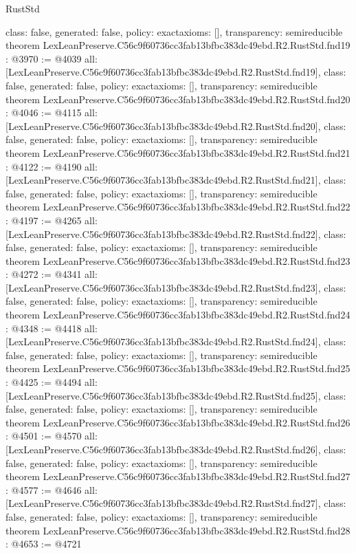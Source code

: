 \begin{lexlean}{RustStd}
\begin{coremodule}
{  class: false,
  generated: false,
  policy: exact{axioms: []},
  transparency: semireducible
}
theorem LexLeanPreserve.C56c9f60736cc3fab13bfbc383dc49ebd.R2.RustStd.fnd19 : @3970 := @4039 {
  all: [LexLeanPreserve.C56c9f60736cc3fab13bfbc383dc49ebd.R2.RustStd.fnd19],
  class: false,
  generated: false,
  policy: exact{axioms: []},
  transparency: semireducible
}
theorem LexLeanPreserve.C56c9f60736cc3fab13bfbc383dc49ebd.R2.RustStd.fnd20 : @4046 := @4115 {
  all: [LexLeanPreserve.C56c9f60736cc3fab13bfbc383dc49ebd.R2.RustStd.fnd20],
  class: false,
  generated: false,
  policy: exact{axioms: []},
  transparency: semireducible
}
theorem LexLeanPreserve.C56c9f60736cc3fab13bfbc383dc49ebd.R2.RustStd.fnd21 : @4122 := @4190 {
  all: [LexLeanPreserve.C56c9f60736cc3fab13bfbc383dc49ebd.R2.RustStd.fnd21],
  class: false,
  generated: false,
  policy: exact{axioms: []},
  transparency: semireducible
}
theorem LexLeanPreserve.C56c9f60736cc3fab13bfbc383dc49ebd.R2.RustStd.fnd22 : @4197 := @4265 {
  all: [LexLeanPreserve.C56c9f60736cc3fab13bfbc383dc49ebd.R2.RustStd.fnd22],
  class: false,
  generated: false,
  policy: exact{axioms: []},
  transparency: semireducible
}
theorem LexLeanPreserve.C56c9f60736cc3fab13bfbc383dc49ebd.R2.RustStd.fnd23 : @4272 := @4341 {
  all: [LexLeanPreserve.C56c9f60736cc3fab13bfbc383dc49ebd.R2.RustStd.fnd23],
  class: false,
  generated: false,
  policy: exact{axioms: []},
  transparency: semireducible
}
theorem LexLeanPreserve.C56c9f60736cc3fab13bfbc383dc49ebd.R2.RustStd.fnd24 : @4348 := @4418 {
  all: [LexLeanPreserve.C56c9f60736cc3fab13bfbc383dc49ebd.R2.RustStd.fnd24],
  class: false,
  generated: false,
  policy: exact{axioms: []},
  transparency: semireducible
}
theorem LexLeanPreserve.C56c9f60736cc3fab13bfbc383dc49ebd.R2.RustStd.fnd25 : @4425 := @4494 {
  all: [LexLeanPreserve.C56c9f60736cc3fab13bfbc383dc49ebd.R2.RustStd.fnd25],
  class: false,
  generated: false,
  policy: exact{axioms: []},
  transparency: semireducible
}
theorem LexLeanPreserve.C56c9f60736cc3fab13bfbc383dc49ebd.R2.RustStd.fnd26 : @4501 := @4570 {
  all: [LexLeanPreserve.C56c9f60736cc3fab13bfbc383dc49ebd.R2.RustStd.fnd26],
  class: false,
  generated: false,
  policy: exact{axioms: []},
  transparency: semireducible
}
theorem LexLeanPreserve.C56c9f60736cc3fab13bfbc383dc49ebd.R2.RustStd.fnd27 : @4577 := @4646 {
  all: [LexLeanPreserve.C56c9f60736cc3fab13bfbc383dc49ebd.R2.RustStd.fnd27],
  class: false,
  generated: false,
  policy: exact{axioms: []},
  transparency: semireducible
}
theorem LexLeanPreserve.C56c9f60736cc3fab13bfbc383dc49ebd.R2.RustStd.fnd28 : @4653 := @4721 {
}
\end{coremodule}
\end{lexlean}
